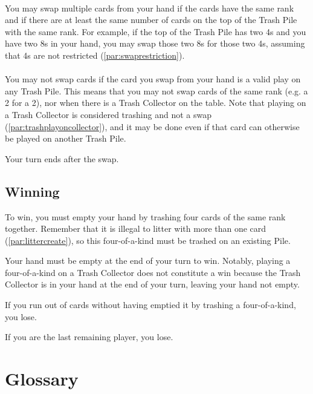 \documentclass{article}
\begin{document}
\paragraph{\label{par:swapmultiple}}
You may swap multiple cards from your hand if the cards have the same rank and if there are at least the same number of cards on the top of the Trash Pile with the same rank. For example, if the top of the Trash Pile has two 4s and you have two 8s in your hand, you may swap those two 8s for those two 4s, assuming that 4s are not restricted (\autoref{par:swaprestriction}).

\paragraph{\label{par:swaprestriction}}
You may not swap cards if the card you swap from your hand is a valid play on any Trash Pile. This means that you may not swap cards of the same rank (e.g. a 2 for a 2), nor when there is a Trash Collector on the table. Note that playing on a Trash Collector is considered trashing and not a swap (\autoref{par:trashplayoncollector}), and it may be done even if that card can otherwise be played on another Trash Pile.

Your turn ends after the swap.

\subsection{Winning \label{sec:winning}}

To win, you must empty your hand by trashing four cards of the same rank together. Remember that it is illegal to litter with more than one card (\autoref{par:littercreate}), so this four-of-a-kind must be trashed on an existing Pile.

Your hand must be empty at the end of your turn to win. Notably, playing a four-of-a-kind on a Trash Collector does not constitute a win because the Trash Collector is in your hand at the end of your turn, leaving your hand not empty.

If you run out of cards without having emptied it by trashing a four-of-a-kind, you lose.

If you are the last remaining player, you lose.

\newpage
\appendix
\section{Glossary \label{sec:glossary}}
\end{document}
